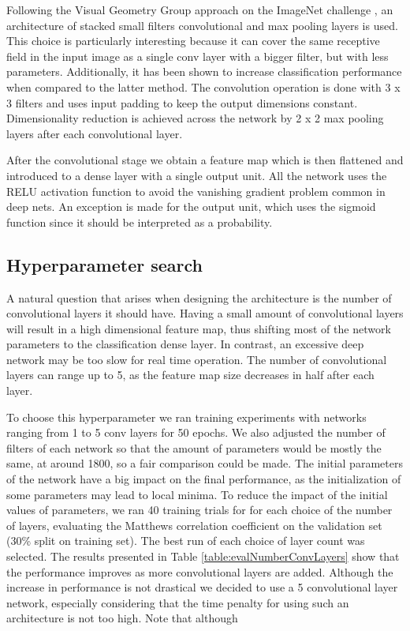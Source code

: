         Following the Visual Geometry Group approach on the ImageNet challenge \cite{Simonyan14c}, an architecture of stacked small filters convolutional and max pooling layers is used. This choice is particularly interesting because it can cover the same receptive field in the input image as a single conv layer with a bigger filter, but with less parameters. Additionally, it has been shown \cite{Simonyan14c} to increase classification performance when compared to the latter method. The convolution operation is done with 3 x 3 filters and uses input padding to keep the output dimensions constant. Dimensionality reduction is achieved across the network by 2 x 2 max pooling layers after each convolutional layer.

        After the convolutional stage we obtain a feature map which is then flattened and introduced to a dense layer with a single output unit. All the network uses the RELU \cite{nair2010relu} activation function to avoid the vanishing gradient problem common in deep nets. An exception is made for the output unit, which uses the sigmoid function since it should be interpreted as a probability.

    \subsection{Hyperparameter search}
        A natural question that arises when designing the architecture is the number of convolutional layers it should have. Having a small amount of convolutional layers will result in a high dimensional feature map, thus shifting most of the network parameters to the classification dense layer. In contrast, an excessive deep network may be too slow for real time operation. The number of convolutional layers can range up to 5, as the feature map size decreases in half after each layer.

        To choose this hyperparameter we ran training experiments with networks ranging from 1 to 5 conv layers for 50 epochs. We also adjusted the number of filters of each network so that the amount of parameters would be mostly the same, at around 1800, so a fair comparison could be made. The initial parameters of the network have a big impact on the final performance, as the initialization of some parameters may lead to local minima. To reduce the impact of the initial values of parameters, we ran 40 training trials for for each choice of the number of layers, evaluating the Matthews correlation coefficient \cite{evaluationMetrics} on the validation set (30\% split on training set). The best run of each choice of layer count was selected. The results presented in Table \ref{table:evalNumberConvLayers} show that the performance improves as more convolutional layers are added. Although the increase in performance is not drastical we decided to use a 5 convolutional layer network, especially considering that the time penalty for using such an architecture is not too high. Note that although

